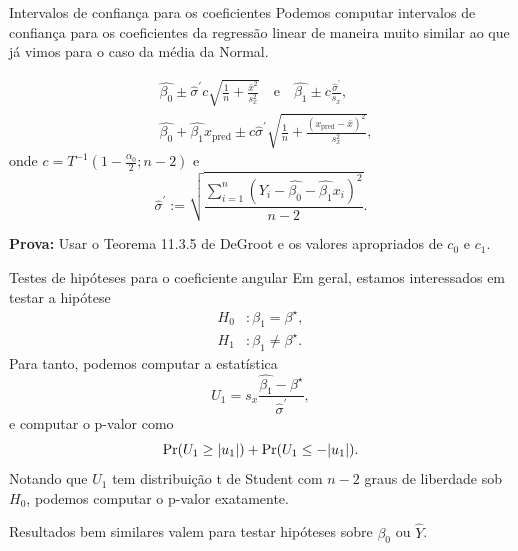 \begin{frame}{Intervalos de confiança para os coeficientes}
Podemos computar intervalos de confiança para os coeficientes da regressão linear de maneira muito similar ao que já vimos para o caso da média da Normal.

\begin{theo}
\label{thm:CIs_linreg_coefficients}
\begin{align*}
 &\hat{\beta_0} \pm \hat{\sigma}^\prime c\sqrt{\frac{1}{n} + \frac{\bar{x}^2}{s_x^2}}\quad \text{e}\quad \hat{\beta_1} \pm c\frac{\hat{\sigma}^\prime}{s_x},\\
 &\hat{\beta_0} + \hat{\beta_1}x_{\text{pred}} \pm c \hat{\sigma}^\prime \sqrt{\frac{1}{n} + \frac{\left(x_{\text{pred}}-\bar{x}\right)^2}{s_x^2} },
\end{align*}
onde $c = T^{-1}(1-\frac{\alpha_0}{2}; n-2)$ e 
\begin{equation*}
 \hat{\sigma}^\prime := \sqrt{\frac{\sum_{i=1}^n \left(Y_i - \hat{\beta_0} - \hat{\beta_1}x_i \right)^2}{n-2}}.
\end{equation*}
\end{theo}
\textbf{Prova:} Usar o Teorema 11.3.5 de DeGroot e os valores apropriados de $c_0$ e $c_1$.
\end{frame}

\begin{frame}{Testes de hipóteses para o coeficiente angular}
Em geral, estamos interessados em testar a hipótese
\begin{align*}
 H_0 &: \beta_1 = \beta^\star,\\
 H_1 &: \beta_1 \neq \beta^\star.
\end{align*}
Para tanto, podemos computar a estatística
\begin{equation*}
 U_1 = s_x \frac{\hat{\beta_1}-\beta^\star}{\hat{\sigma}^\prime},
\end{equation*}
e computar o p-valor como 
\begin{equation*}
 \operatorname{Pr}(U_1 \geq |u_1|) + \operatorname{Pr}(U_1 \leq -|u_1|).
\end{equation*}
Notando que $U_1$ tem distribuição t de Student com $n-2$ graus de liberdade sob $H_0$, podemos computar o p-valor exatamente.

Resultados bem similares valem para testar hipóteses sobre $\beta_0$ ou $\hat{Y}$.
\end{frame}


